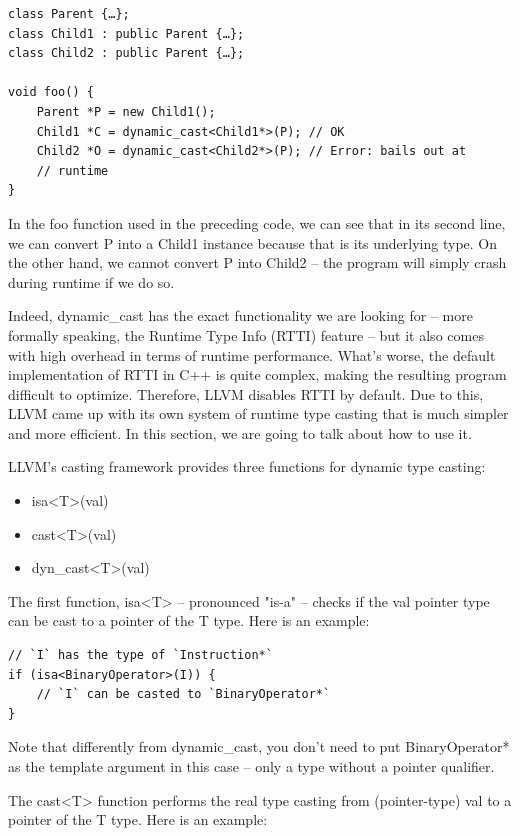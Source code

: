 \begin{lstlisting}[style=styleCXX]
class Parent {…};
class Child1 : public Parent {…};
class Child2 : public Parent {…};

void foo() {
	Parent *P = new Child1();
	Child1 *C = dynamic_cast<Child1*>(P); // OK
	Child2 *O = dynamic_cast<Child2*>(P); // Error: bails out at
	// runtime
}
\end{lstlisting}

In the foo function used in the preceding code, we can see that in its second line, we can convert P into a Child1 instance because that is its underlying type. On the other hand, we cannot convert P into Child2 – the program will simply crash during runtime if we do so. 

Indeed, dynamic\_cast has the exact functionality we are looking for – more formally speaking, the Runtime Type Info (RTTI) feature – but it also comes with high overhead in terms of runtime performance. What's worse, the default implementation of RTTI in C++ is quite complex, making the resulting program difficult to optimize. Therefore, LLVM disables RTTI by default. Due to this, LLVM came up with its own system of runtime type casting that is much simpler and more efficient. In this section, we are going to talk about how to use it.

LLVM's casting framework provides three functions for dynamic type casting:

\begin{itemize}
\ttfamily
\item isa<T>(val)
\item cast<T>(val)
\item dyn\_cast<T>(val)
\end{itemize}

The first function, isa<T> – pronounced "is-a" – checks if the val pointer type can be cast to a pointer of the T type. Here is an example:

\begin{lstlisting}[style=styleCXX]
// `I` has the type of `Instruction*`
if (isa<BinaryOperator>(I)) {
	// `I` can be casted to `BinaryOperator*`
}
\end{lstlisting}

Note that differently from dynamic\_cast, you don't need to put BinaryOperator* as the template argument in this case – only a type without a pointer qualifier.

The cast<T> function performs the real type casting from (pointer-type) val to a pointer of the T type. Here is an example:

